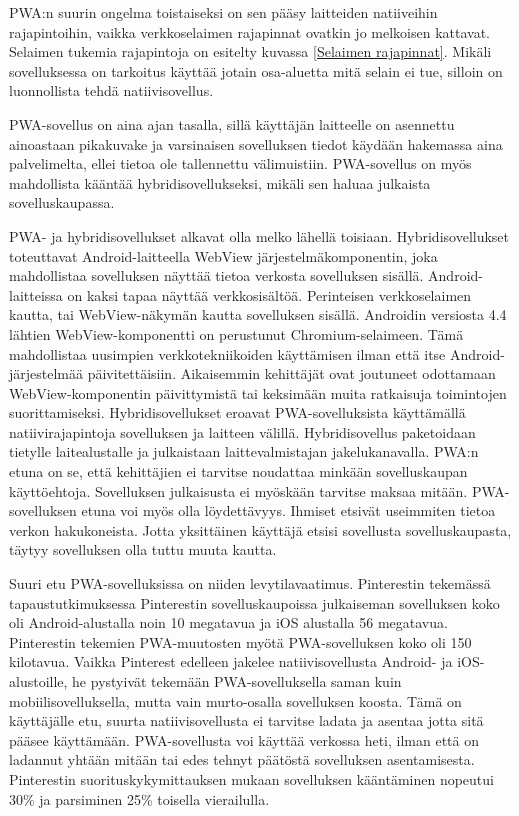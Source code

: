 \documentclass{tktltiki}
\begin{document}
PWA:n suurin ongelma toistaiseksi on sen pääsy laitteiden natiiveihin rajapintoihin, vaikka verkkoselaimen rajapinnat ovatkin jo melkoisen kattavat. Selaimen tukemia rajapintoja on esitelty kuvassa \ref{Selaimen rajapinnat}. Mikäli sovelluksessa on tarkoitus käyttää jotain osa-aluetta mitä selain ei tue, silloin on luonnollista tehdä natiivisovellus.

PWA-sovellus on aina ajan tasalla, sillä käyttäjän laitteelle on asennettu ainoastaan pikakuvake ja varsinaisen sovelluksen tiedot käydään hakemassa aina palvelimelta, ellei tietoa ole tallennettu välimuistiin. PWA-sovellus on myös mahdollista kääntää hybridisovellukseksi, mikäli sen haluaa julkaista sovelluskaupassa. 

PWA- ja hybridisovellukset alkavat olla melko lähellä toisiaan. Hybridisovellukset toteuttavat Android-laitteella WebView järjestelmäkomponentin, joka mahdollistaa sovelluksen näyttää tietoa verkosta sovelluksen sisällä. Android-laitteissa on kaksi tapaa näyttää verkkosisältöä. Perinteisen verkkoselaimen kautta, tai WebView-näkymän kautta sovelluksen sisällä. Androidin versiosta 4.4 \cite{chromedeveloper} lähtien WebView-komponentti on perustunut Chromium-selaimeen. Tämä mahdollistaa uusimpien verkkotekniikoiden käyttämisen ilman että itse Android-järjestelmää päivitettäisiin. Aikaisemmin kehittäjät ovat joutuneet odottamaan WebView-komponentin päivittymistä tai keksimään muita ratkaisuja toimintojen suorittamiseksi. Hybridisovellukset eroavat PWA-sovelluksista käyttämällä natiivirajapintoja sovelluksen ja laitteen välillä. Hybridisovellus paketoidaan tietylle laitealustalle ja julkaistaan laittevalmistajan jakelukanavalla. PWA:n etuna on se, että kehittäjien ei tarvitse noudattaa minkään sovelluskaupan käyttöehtoja. Sovelluksen julkaisusta ei myöskään tarvitse maksaa mitään. PWA-sovelluksen etuna voi myös olla löydettävyys. Ihmiset etsivät useimmiten tietoa verkon hakukoneista. Jotta yksittäinen käyttäjä etsisi sovellusta sovelluskaupasta, täytyy sovelluksen olla tuttu muuta kautta. 

Suuri etu PWA-sovelluksissa on niiden levytilavaatimus. Pinterestin tekemässä tapaustutkimuksessa \cite{Osmani} Pinterestin sovelluskaupoissa julkaiseman sovelluksen koko oli Android-alustalla noin 10 megatavua ja iOS alustalla 56 megatavua. Pinterestin tekemien PWA-muutosten myötä PWA-sovelluksen koko oli 150 kilotavua. Vaikka Pinterest edelleen jakelee natiivisovellusta Android- ja iOS-alustoille, he pystyivät tekemään PWA-sovelluksella saman kuin mobiilisovelluksella, mutta vain murto-osalla sovelluksen koosta. Tämä on käyttäjälle etu, suurta natiivisovellusta ei tarvitse ladata ja asentaa jotta sitä pääsee käyttämään. PWA-sovellusta voi käyttää verkossa heti, ilman että on ladannut yhtään mitään tai edes tehnyt päätöstä sovelluksen asentamisesta. Pinterestin suorituskykymittauksen mukaan \cite{Osmani} sovelluksen kääntäminen nopeutui 30\% ja parsiminen 25\% toisella vierailulla.  
\end{document}
